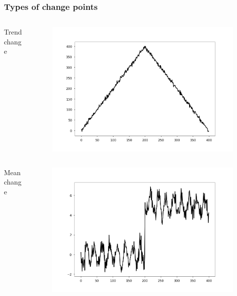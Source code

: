 \documentclass[intlimits, 9pt, unicode]{beamer}
\begin{document}
\begin{frame}
    \frametitle{Types of change points}

\begin{columns}
 \begin{column}{0.5\textwidth}
 
  \begin{columns}
      \begin{column}{0.3\textwidth}
      \centering
      Trend change
      \end{column}
      \begin{column}{0.5\textwidth}
      \begin{figure}
		\includegraphics[scale=0.08]{images/examples_trend}
	\end{figure}
	\end{column}
     \end{columns}
     
  \begin{columns}
      \begin{column}{0.3\textwidth}
      \centering
      Mean change
      \end{column}
      \begin{column}{0.5\textwidth}
      \begin{figure}
		\includegraphics[scale=0.08]{images/examples_mean}
	\end{figure}
	\end{column}
     \end{columns}
     

\end{column}
\end{columns}
\end{frame}
\end{document}

